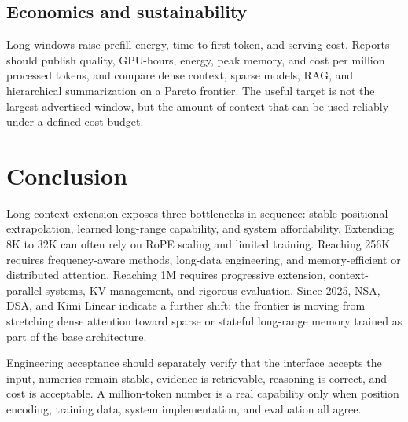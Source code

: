 \documentclass[UTF8,10pt,a4paper,fontset=none]{ctexart}
\begin{document}
\subsection{Economics and sustainability}
Long windows raise prefill energy, time to first token, and serving cost. Reports should publish quality, GPU-hours, energy, peak memory, and cost per million processed tokens, and compare dense context, sparse models, RAG, and hierarchical summarization on a Pareto frontier. The useful target is not the largest advertised window, but the amount of context that can be used reliably under a defined cost budget.

\section{Conclusion}

Long-context extension exposes three bottlenecks in sequence: stable positional extrapolation, learned long-range capability, and system affordability. Extending 8K to 32K can often rely on RoPE scaling and limited training. Reaching 256K requires frequency-aware methods, long-data engineering, and memory-efficient or distributed attention. Reaching 1M requires progressive extension, context-parallel systems, KV management, and rigorous evaluation. Since 2025, NSA, DSA, and Kimi Linear indicate a further shift: the frontier is moving from stretching dense attention toward sparse or stateful long-range memory trained as part of the base architecture.

Engineering acceptance should separately verify that the interface accepts the input, numerics remain stable, evidence is retrievable, reasoning is correct, and cost is acceptable. A million-token number is a real capability only when position encoding, training data, system implementation, and evaluation all agree.
\end{document}
